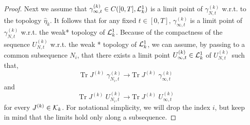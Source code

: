 \documentclass[11pt]{article}
\newcommand{\tr}{\mbox{Tr}}
\newcommand{\wh}{\widehat}
\newcommand{\cK}{{\cal K}}
\newcommand{\cL}{{\cal L}}
\begin{document}
\begin{proof}
Next we assume that $ \gamma_{\infty,t}^{(k)} \in C([0,T], \cL^1_k)$
is a limit point of $ \gamma_{N,t}^{(k)}$ w.r.t. to the topology
$\wh\eta_k$. It follows that for any fixed $t \in [0,T]$, $
\gamma_{\infty,t}^{(k)}$ is a limit point of $ \gamma_{N,t}^{(k)}$
w.r.t. the weak* topology of $\cL_k^1$. Because of the compactness
of the sequence $U^{(k)}_{N,t}$ w.r.t. the weak * topology of
$\cL^1_k$, we can assume, by passing to a common subsequence $N_i$,
that there exists a limit point $U^{(k)}_{\infty,t} \in \cL^1_k$ of
$U^{(k)}_{N,t}$ such that,
\begin{equation}\label{eq:apriorik-2}
\tr \; J^{(k)} \;  \gamma_{N_i,t}^{(k)} \to \tr \; J^{(k)} \;
\gamma_{\infty,t}^{(k)}
\end{equation}
and
\begin{equation}\label{eq:apriorik-3}
\tr \; J^{(k)} \; U_{N_i,t}^{(k)} \to \tr \; J^{(k)} \;
U_{\infty,t}^{(k)}
\end{equation}
for every $J^{(k)} \in \cK_k$. For notational simplicity, we will
drop the index $i$, but keep in mind that the limits hold only along
a subsequence.


\end{proof}
\end{document}
